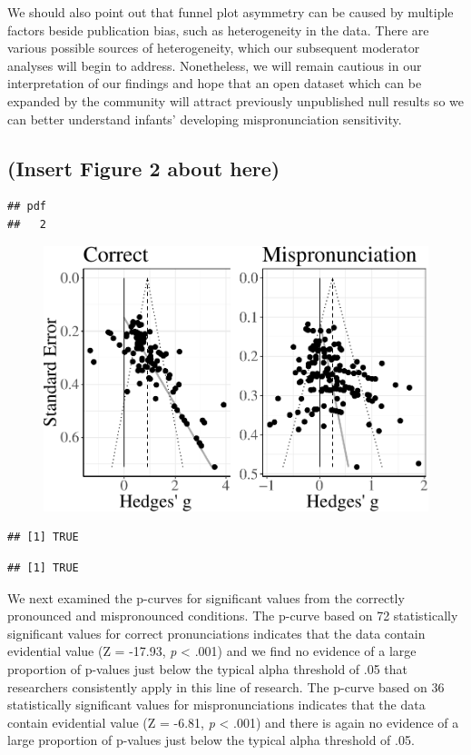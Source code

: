 \documentclass[man]{apa6}
\theoremstyle{definition}
\theoremstyle{definition}
\theoremstyle{definition}
\theoremstyle{remark}
\begin{document}
We should also point out that funnel plot asymmetry can be caused by
multiple factors beside publication bias, such as heterogeneity in the
data. There are various possible sources of heterogeneity, which our
subsequent moderator analyses will begin to address. Nonetheless, we
will remain cautious in our interpretation of our findings and hope that
an open dataset which can be expanded by the community will attract
previously unpublished null results so we can better understand infants'
developing mispronunciation sensitivity.

\subsection{(Insert Figure 2 about
here)}\label{insert-figure-2-about-here}

\begin{verbatim}
## pdf 
##   2
\end{verbatim}

\begin{figure}
\centering
\includegraphics{Paper_Analyses_files/figure-latex/FunnelCombo-1.pdf}
\caption{}
\end{figure}

\begin{verbatim}
## [1] TRUE
\end{verbatim}

\begin{verbatim}
## [1] TRUE
\end{verbatim}

We next examined the p-curves for significant values from the correctly
pronounced and mispronounced conditions. The p-curve based on 72
statistically significant values for correct pronunciations indicates
that the data contain evidential value (Z = -17.93, \emph{p} \textless{}
.001) and we find no evidence of a large proportion of p-values just
below the typical alpha threshold of .05 that researchers consistently
apply in this line of research. The p-curve based on 36 statistically
significant values for mispronunciations indicates that the data contain
evidential value (Z = -6.81, \emph{p} \textless{} .001) and there is
again no evidence of a large proportion of p-values just below the
typical alpha threshold of .05.
\end{document}
